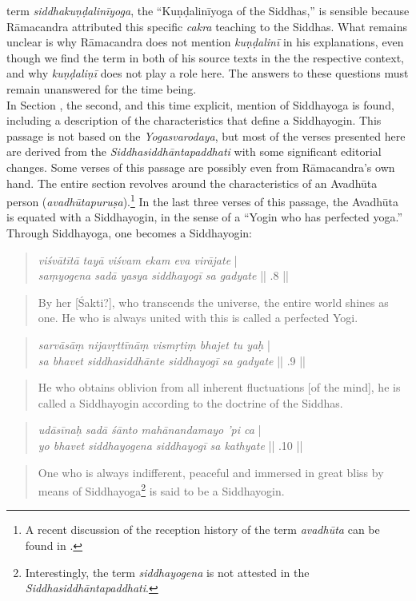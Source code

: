 term \textit{siddhakuṇḍalinīyoga}, the ``Kuṇḍalinīyoga of the Siddhas,'' is sensible because Rāmacandra attributed this specific \textit{cakra} teaching to the Siddhas. What remains unclear is why Rāmacandra does not mention \textit{kuṇḍalinī} in his explanations, even though we find the term in both of his source texts in the the respective context, and why \textit{kuṇḍaliṇī} does not play a role here. The answers to these questions must remain unanswered for the time being.\\  

In Section , the second, and this time explicit, mention of Siddhayoga is found, including a description of the characteristics that define a Siddhayogin. This passage is not based on the \textit{Yogasvarodaya}, but most of the verses presented here are derived from the \textit{Siddhasiddhāntapaddhati} with some significant editorial changes. Some verses of this passage are possibly even from Rāmacandra's own hand. The entire section revolves around the characteristics of an Avadhūta person (\textit{avadhūtapuruṣa}).\footnote{A recent discussion of the reception history of the term \textit{avadhūta} can be found in \cite{pudi2023}.} In the last three verses of this passage, the Avadhūta is equated with a Siddhayogin, in the sense of a ``Yogin who has perfected yoga.'' Through Siddhayoga, one becomes a Siddhayogin:

\begin{quote}
  \textit{viśvātītā tayā viśvam ekam eva virājate} |\\
  \textit{saṃyogena sadā yasya siddhayogī sa gadyate} || .8 ||
\end{quote}
\begin{quote}
  By her [Śakti?], who transcends the universe, the entire world shines as one. He who is always united with this is called a perfected Yogi. 
\end{quote}
\begin{quote}
  \textit{sarvāsāṃ nijavṛttīnāṃ vismṛtiṃ bhajet tu yaḥ} |\\
  \textit{sa bhavet siddhasiddhānte siddhayogī sa gadyate} || .9 ||
\end{quote}
\begin{quote}
  He who obtains oblivion from all inherent fluctuations [of the mind], he is called a Siddhayogin according to the doctrine of the Siddhas.
\end{quote}
  \begin{quote}
  \textit{udāsīnaḥ sadā śānto mahānandamayo 'pi ca} |\\
  \textit{yo bhavet siddhayogena siddhayogī sa kathyate} || .10 ||
\end{quote}
\begin{quote}
One who is always indifferent, peaceful and immersed in great bliss by means of Siddhayoga\footnote{Interestingly, the term \textit{siddhayogena} is not attested in the \textit{Siddhasiddhāntapaddhati}.} is said to be a Siddhayogin.
\end{quote}

